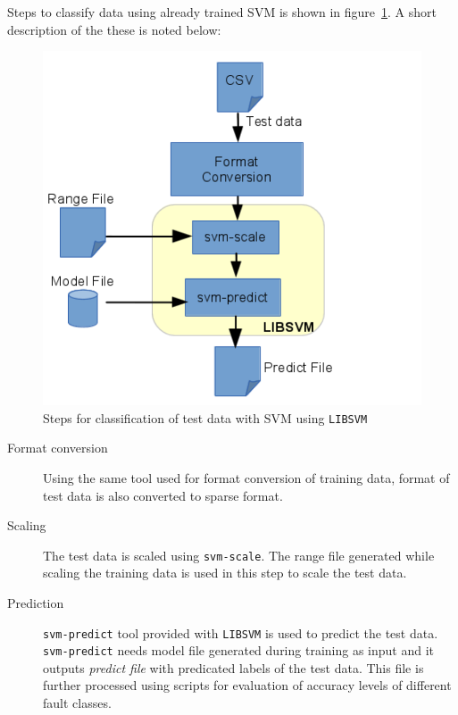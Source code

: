 Steps to classify data using already trained SVM is shown in figure~\ref{fig:libsvmpredict}. A short description of the these is noted below:

\begin{figure}[h]
  \begin{center}
    \captionsetup{justification=centering}
    \includegraphics[scale=0.75]{figures/libsvmpredict.png}
    \caption{Steps for classification of test data with SVM using \texttt{LIBSVM}}
    \label{fig:libsvmpredict}
  \end{center}
\end{figure}

\begin{description}

   \item[Format conversion] Using the same tool used for format conversion of training data, format of test data is also converted to sparse format.

  \item[Scaling] The test data is scaled using \texttt{svm-scale}. The range file generated while scaling the training data is used in this step to scale the test data.
  
  \item[Prediction] \texttt{svm-predict} tool provided with \texttt{LIBSVM} is used to predict the test data. \texttt{svm-predict} needs model file generated during training as input and it outputs \emph{predict file} with predicated labels of the test data. This file is further processed using scripts for evaluation of accuracy levels of different fault classes.
  
\end{description}
